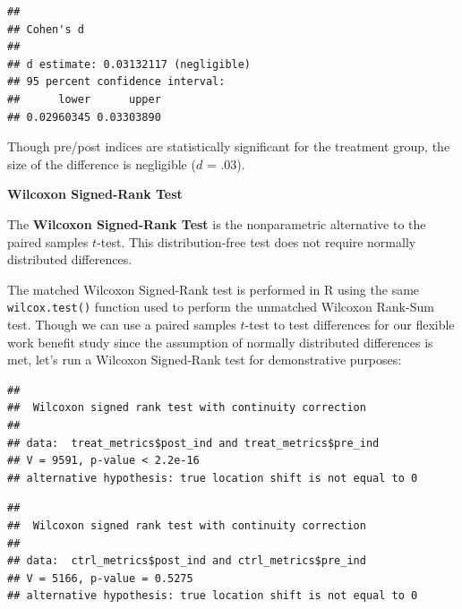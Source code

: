 \documentclass[]{book}
\newenvironment{Shaded}{\begin{snugshade}}{\end{snugshade}}
\newcommand{\CommentTok}[1]{\textcolor[rgb]{0.56,0.35,0.01}{\textit{#1}}}
\newcommand{\DataTypeTok}[1]{\textcolor[rgb]{0.13,0.29,0.53}{#1}}
\newcommand{\KeywordTok}[1]{\textcolor[rgb]{0.13,0.29,0.53}{\textbf{#1}}}
\newcommand{\NormalTok}[1]{#1}
\newcommand{\OperatorTok}[1]{\textcolor[rgb]{0.81,0.36,0.00}{\textbf{#1}}}
\newcommand{\OtherTok}[1]{\textcolor[rgb]{0.56,0.35,0.01}{#1}}
\begin{document}
\begin{verbatim}
## 
## Cohen's d
## 
## d estimate: 0.03132117 (negligible)
## 95 percent confidence interval:
##      lower      upper 
## 0.02960345 0.03303890
\end{verbatim}

Though pre/post indices are statistically significant for the treatment group, the size of the difference is negligible (\(d\) = .03).

\textbf{Wilcoxon Signed-Rank Test}

The \textbf{Wilcoxon Signed-Rank Test} is the nonparametric alternative to the paired samples \(t\)-test. This distribution-free test does not require normally distributed differences.

The matched Wilcoxon Signed-Rank test is performed in R using the same \texttt{wilcox.test()} function used to perform the unmatched Wilcoxon Rank-Sum test. Though we can use a paired samples \(t\)-test to test differences for our flexible work benefit study since the assumption of normally distributed differences is met, let's run a Wilcoxon Signed-Rank test for demonstrative purposes:

\begin{Shaded}
\end{Shaded}

\begin{verbatim}
## 
##  Wilcoxon signed rank test with continuity correction
## 
## data:  treat_metrics$post_ind and treat_metrics$pre_ind
## V = 9591, p-value < 2.2e-16
## alternative hypothesis: true location shift is not equal to 0
\end{verbatim}

\begin{Shaded}
\end{Shaded}

\begin{verbatim}
## 
##  Wilcoxon signed rank test with continuity correction
## 
## data:  ctrl_metrics$post_ind and ctrl_metrics$pre_ind
## V = 5166, p-value = 0.5275
## alternative hypothesis: true location shift is not equal to 0
\end{verbatim}
\end{document}
